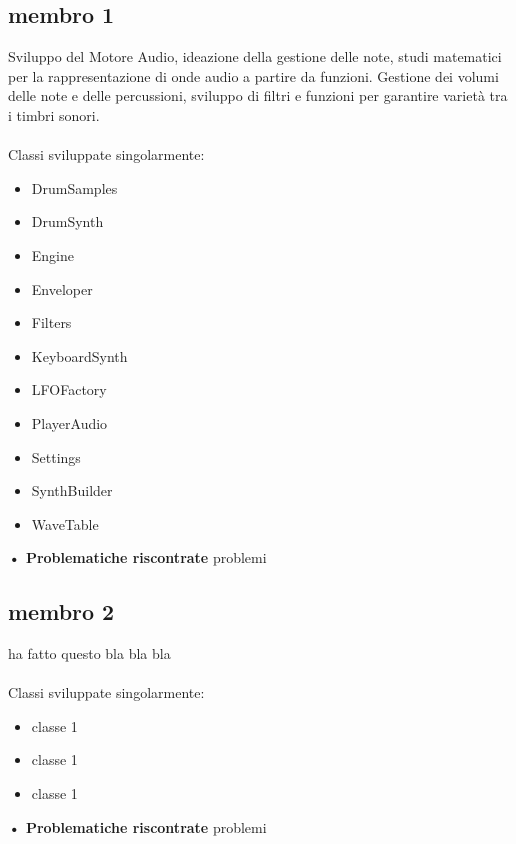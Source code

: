 \documentclass[a4paper,12pt]{report}
\begin{document}
\subsection{membro 1}
Sviluppo del Motore Audio, ideazione della gestione delle note, studi matematici per la rappresentazione di onde audio a partire da funzioni.
Gestione dei volumi delle note e delle percussioni, sviluppo di filtri e funzioni per garantire varietà tra i timbri sonori. \\ \\
Classi sviluppate singolarmente:
{
	\begin{itemize}
		\item DrumSamples
		\item DrumSynth
		\item Engine
		\item Enveloper
		\item Filters
		\item KeyboardSynth
		\item LFOFactory
		\item PlayerAudio
		\item Settings
		\item SynthBuilder
		\item WaveTable
	\end{itemize}
}
\hfill\break
\textbf{• Problematiche riscontrate}\hfill\break
problemi 
\newpage

\subsection{membro 2}
ha fatto questo bla bla bla \\ \\
Classi sviluppate singolarmente:
{
	\begin{itemize}
		\item classe 1
		\item classe 1
		\item classe 1
	\end{itemize}
}
\hfill\break
\textbf{• Problematiche riscontrate}\hfill\break
problemi 
\newpage
\end{document}
